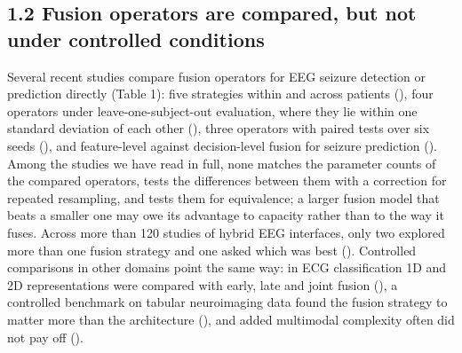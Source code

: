 \documentclass[11pt,a4paper]{article}
\newcounter{none} %
\begin{document}
\subsection{1.2 Fusion operators are compared, but not under controlled conditions}\label{fusion-operators-are-compared-but-not-under-controlled-conditions}

Several recent studies compare fusion operators for EEG seizure detection or prediction
directly (Table 1): five strategies within and across patients (\citealp{An_2026}), four
operators under leave-one-subject-out evaluation, where they lie within one standard
deviation of each other (\citealp{Einizade_2023}), three operators with paired tests over
six seeds (\citealp{Basheer_2026}), and feature-level against decision-level fusion for
seizure prediction (\citealp{Dasdemir_2025}). Among the studies we have read in full,
none matches the parameter counts of the compared operators, tests the differences
between them with a correction for repeated resampling, and tests them for equivalence;
a larger fusion model that beats a smaller one may owe its advantage to capacity rather
than to the way it fuses. Across more than 120 studies of hybrid EEG interfaces, only two
explored more than one fusion strategy and one asked which was best (\citealp{Lee_2025}).
Controlled comparisons in other domains point the same way: in ECG classification 1D and
2D representations were compared with early, late and joint fusion (\citealp{Narotamo_2024}), a controlled benchmark on tabular neuroimaging data found the fusion strategy to
matter more than the architecture (\citealp{Camastra_2026}), and added multimodal
complexity often did not pay off (\citealp{Rheude_2025}).

\begingroup\small
\end{document}
